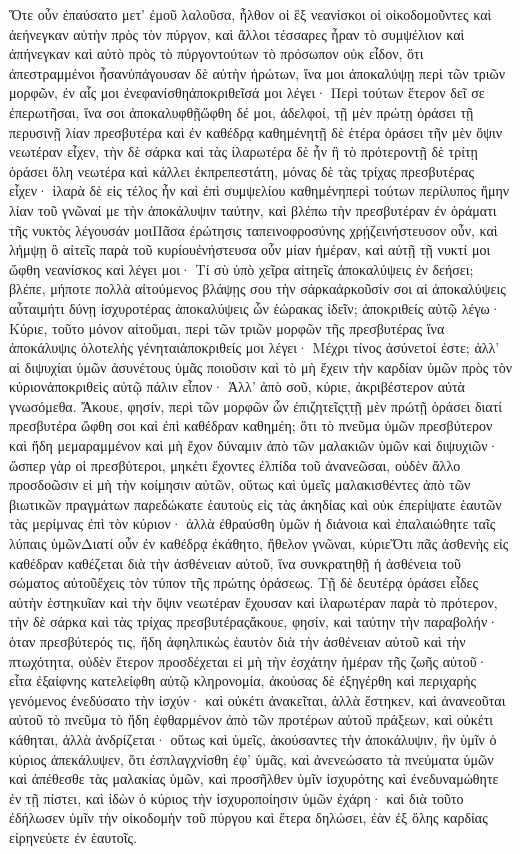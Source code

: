 Ὅτε οὖν ἐπαύσατο μετ’ ἐμοῦ λαλοῦσα, ἦλθον οἱ ἓξ νεανίσκοι οἱ οἰκοδομοῦντες καὶ ἀεήνεγκαν αὐτὴν πρὸς τὸν πύργον, καὶ ἄλλοι τέσσαρες ἦραν τὸ συμψέλιον καὶ ἀπήνεγκαν καὶ αὐτὸ πρὸς τὸ πύργοντούτων τὸ πρόσωπον οὐκ εἶδον, ὅτι ἀπεστραμμένοι ἦσανὑπάγουσαν δὲ αὐτὴν ἠρώτων, ἵνα μοι ἀποκαλύψῃ περὶ τῶν τριῶν μορφῶν, ἐν αἷς μοι ἐνεφανίσθηἀποκριθεῖσά μοι λέγει· Περὶ τούτων ἕτερον δεῖ σε ἐπερωτῆσαι, ἵνα σοι ἀποκαλυφθῇὤφθη δέ μοι, ἀδελφοί, τῇ μὲν πρώτῃ ὁράσει τῇ περυσινῇ λίαν πρεσβυτέρα καὶ ἐν καθέδρᾳ καθημένητῇ δὲ ἑτέρα ὁράσει τῆν μὲν ὄψιν νεωτέραν εἶχεν, τὴν δὲ σάρκα καὶ τὰς ἱλαρωτέρα δὲ ἦν ἢ τὸ πρότεροντῇ δὲ τρίτῃ ὁράσει ὅλη νεωτέρα καὶ κάλλει ἐκπρεπεστάτη, μόνας δὲ τὰς τρίχας πρεσβυτέρας εἶχεν· ἱλαρὰ δὲ εἰς τέλος ἦν καὶ ἐπὶ συμψελίου καθημένηπερὶ τούτων περίλυπος ἤμην λίαν τοῦ γνῶναί με τὴν ἀποκάλυψιν ταύτην, καὶ βλέπω τὴν πρεσβυτέραν ἐν ὁράματι τῆς νυκτὸς λέγουσάν μοιΠᾶσα ἐρώτησις ταπεινοφροσύνης χρῄζεινήστευσον οὖν, καὶ λήμψῃ ὃ αἰτεῖς παρὰ τοῦ κυρίουἐνήστευσα οὖν μίαν ἡμέραν, καὶ αὐτῇ τῇ νυκτί μοι ὤφθη νεανίσκος καὶ λέγει μοι· Τί σὺ ὑπὸ χεῖρα αἰτηεῖς ἀποκαλύψεις ἐν δεήσει; βλέπε, μήποτε πολλὰ αἰτούμενος βλάψῃς σου τὴν σάρκαἀρκοῦσίν σοι αἱ ἀποκαλύψεις αὗταιμήτι δύνῃ ἰσχυροτέρας ἀποκαλύψεις ὧν ἑώρακας ἰδεῖν; ἀποκριθείς αὐτῷ λέγω· Κύριε, τοῦτο μόνον αἰτοῦμαι, περὶ τῶν τριῶν μορφῶν τῆς πρεσβυτέρας ἵνα ἀποκάλυψις ὁλοτελὴς γένηταιἀποκριθείς μοι λέγει· Μέχρι τίνος ἀσύνετοί ἐστε; ἀλλ’ αἱ διψυχίαι ὑμῶν ἀσυνέτους ὑμᾶς ποιοῦσιν καὶ τὸ μὴ ἔχειν τὴν καρδίαν ὑμῶν πρὸς τὸν κύριονἀποκριθεὶς αὐτῷ πάλιν εἶπον· Ἀλλ’ ἀπὸ σοῦ, κύριε, ἀκριβέστερον αὐτὰ γνωσόμεθα.
Ἄκουε, φησίν, περὶ τῶν μορφῶν ὧν ἐπιζητεῖςτͅτῇ μὲν πρώτῇ ὁράσει διατί πρεσβυτέρα ὤφθη σοι καὶ ἐπὶ καθέδραν καθημέη; ὅτι τὸ πνεῦμα ὑμῶν πρεσβύτερον καὶ ἤδη μεμαραμμένον καὶ μὴ ἔχον δύναμιν ἀπὸ τῶν μαλακιῶν ὑμῶν καὶ διψυχιῶν· ὥσπερ γὰρ οἱ πρεσβύτεροι, μηκέτι ἔχοντες ἐλπίδα τοῦ ἀνανεῶσαι, οὐδὲν ἄλλο προσδοῶσιν εἰ μὴ τὴν κοίμησιν αὐτῶν, οὕτως καὶ ὑμεῖς μαλακισθέντες ἀπὸ τῶν βιωτικῶν πραγμάτων παρεδώκατε ἑαυτοὺς εἰς τὰς ἀκηδίας καὶ οὐκ ἐπερίψατε ἑαυτῶν τὰς μερίμνας ἐπὶ τὸν κύριον· ἀλλὰ ἐθραύσθη ὑμῶν ἡ διάνοια καὶ ἐπαλαιώθητε ταῖς λύπαις ὑμῶνΔιατί οὖν ἐν καθέδρᾳ ἐκάθητο, ἤθελον γνῶναι, κύριεὍτι πᾶς ἀσθενὴς εἰς καθέδραν καθέζεται διὰ τὴν ἀσθένειαν αὐτοῦ, ἵνα συνκρατηθῇ ἡ ἀσθένεια τοῦ σώματος αὐτοῦἔχεις τὸν τύπον τῆς πρώτης ὁράσεως.
Τῇ δὲ δευτέρᾳ ὁράσει εἶδες αὐτὴν ἑστηκυῖαν καὶ τὴν ὄψιν νεωτέραν ἔχουσαν καὶ ἱλαρωτέραν παρὰ τὸ πρότερον, τὴν δὲ σάρκα καὶ τὰς τρίχας πρεσβυτέραςἄκουε, φησίν, καὶ ταύτην τὴν παραβολήν· ὁταν πρεσβύτερός τις, ἤδη ἀφηλπικὼς ἑαυτὸν διὰ τὴν ἀσθένειαν αὐτοῦ καὶ τὴν πτωχότητα, οὐδὲν ἕτερον προσδέχεται εἰ μὴ τὴν ἐσχάτην ἡμέραν τῆς ζωῆς αὐτοῦ· εἶτα ἐξαίφνης κατελείφθη αὐτῷ κληρονομία, ἀκούσας δὲ ἐξηγέρθη καὶ περιχαρὴς γενόμενος ἐνεδύσατο τὴν ἰσχύν· καὶ οὐκέτι ἀνακεῖται, ἀλλὰ ἕστηκεν, καὶ ἀνανεοῦται αὐτοῦ τὸ πνεῦμα τὸ ἤδη ἐφθαρμένον ἀπὸ τῶν προτέρων αὐτοῦ πράξεων, καὶ οὐκέτι κάθηται, ἀλλὰ ἀνδρίζεται· οὕτως καὶ ὑμεῖς, ἀκούσαντες τὴν ἀποκάλυψιν, ἣν ὑμῖν ὁ κύριος ἀπεκάλυψεν, ὅτι ἐσπλαγχνίσθη ἐφ’ ὑμᾶς, καὶ ἀνενεώσατο τὰ πνεύματα ὑμῶν καὶ ἀπέθεσθε τὰς μαλακίας ὑμῶν, καὶ προσῆλθεν ὑμῖν ἰσχυρότης καὶ ἐνεδυναμώθητε ἐν τῇ πίστει, καὶ ἰδὼν ὁ κύριος τὴν ἰσχυροποίησιν ὑμῶν ἐχάρη· καὶ διὰ τοῦτο ἐδήλωσεν ὑμῖν τὴν οἰκοδομὴν τοῦ πύργου καὶ ἕτερα δηλώσει, ἐὰν ἐξ ὅλης καρδίας εἰρηνεύετε ἐν ἑαυτοῖς.
